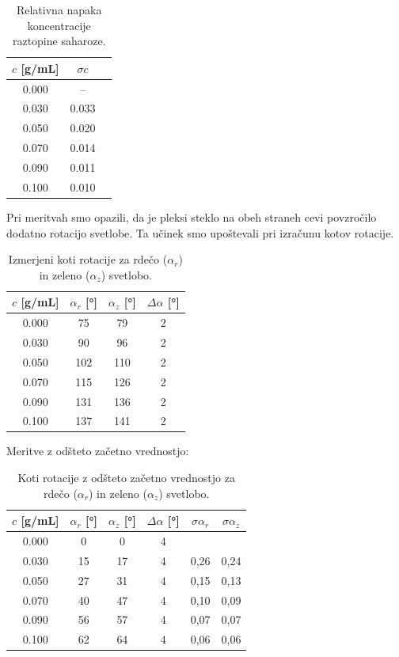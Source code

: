 \documentclass[a4paper,12pt]{article}
\begin{document}
\begin{table}[H]
\centering
\begin{tabular}{ccc}
\toprule
$c$ [g/mL] & $\sigma c$ \\
\midrule
0.000 & -- \\
0.030 & 0.033 \\
0.050 & 0.020 \\
0.070 & 0.014 \\
0.090 & 0.011 \\
0.100 & 0.010 \\
\bottomrule
\end{tabular}
\caption{Relativna napaka koncentracije raztopine saharoze.}
\end{table}

Pri meritvah smo opazili, da je pleksi steklo na obeh straneh cevi povzročilo dodatno rotacijo svetlobe. Ta učinek smo upoštevali pri izračunu kotov rotacije.
\begin{table}[H]
\centering
\begin{tabular}{cccc}
\toprule
$c$ [g/mL] & $\alpha_r$ [°] & $\alpha_z$ [°] & $\Delta\alpha$ [°] \\
\midrule
0.000 & 75  & 79  & 2 \\
0.030 & 90  & 96  & 2 \\
0.050 & 102 & 110 & 2 \\
0.070 & 115 & 126 & 2 \\
0.090 & 131 & 136 & 2 \\
0.100 & 137 & 141 & 2 \\
\bottomrule
\end{tabular}
\caption{Izmerjeni koti rotacije za rdečo ($\alpha_r$) in zeleno ($\alpha_z$) svetlobo.}
\end{table}

Meritve z odšteto začetno vrednostjo:

\begin{table}[H]
\centering
\begin{tabular}{cccccc}
\toprule
$c$ [g/mL] & $\alpha_r$ [°] & $\alpha_z$ [°]  & $\Delta \alpha$ [°] & $\sigma \alpha_r$ & $\sigma \alpha_z$ \\
\midrule
0.000 & 0  & 0 & 4 &  \\
0.030 & 15 & 17 & 4 & 0,26 & 0,24 \\
0.050 & 27 & 31 & 4 & 0,15 & 0,13 \\
0.070 & 40 & 47 & 4 & 0,10 & 0,09 \\
0.090 & 56 & 57 & 4 & 0,07 & 0,07 \\
0.100 & 62 & 64 & 4 & 0,06 & 0,06 \\
\bottomrule
\end{tabular}
\caption{Koti rotacije z odšteto začetno vrednostjo za rdečo ($\alpha_r$) in zeleno ($\alpha_z$) svetlobo.}
\end{table}
\end{document}
